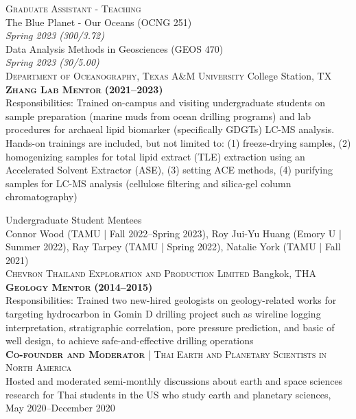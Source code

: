 \documentclass[11pt, letter]{article}
\newcommand{\margintext}[1]{\marginnote{\normalsize\textbf #1 |}}
\begin{document}
\bigskip
\textsc{Graduate Assistant - Teaching} \\
The Blue Planet - Our Oceans (OCNG 251) \\
\textit{Spring 2023 (300/3.72)} \\
Data Analysis Methods in Geosciences (GEOS 470) \\
\textit{Spring 2023 (30/5.00)} \\

\margintext{Mentoring}
\textsc{Department of Oceanography, Texas A\&M University} \hfill College Station, TX \\
\textsc{\textbf{Zhang Lab Mentor}} \textbf{(2021–2023)}\\
\footnotesize 
{\color{gray} Responsibilities: Trained on-campus and visiting undergraduate students on sample preparation (marine muds from ocean drilling programs) and lab procedures for archaeal lipid biomarker (specifically GDGTs) LC-MS analysis. Hands-on trainings are included, but not limited to: (1) freeze-drying samples, (2) homogenizing samples for total lipid extract (TLE) extraction using an Accelerated Solvent Extractor (ASE), (3) setting ACE methods, (4) purifying samples for LC-MS analysis (cellulose filtering and silica-gel column chromatography)}

\normalsize
\bigskip
Undergraduate Student Mentees \\
Connor Wood (TAMU | Fall 2022–Spring 2023), Roy Jui-Yu Huang (Emory U | Summer 2022), Ray Tarpey (TAMU | Spring 2022), Natalie York (TAMU | Fall 2021) \\

\textsc{Chevron Thailand Exploration and Production Limited} \hfill Bangkok, THA \\
\textsc{\textbf{Geology Mentor}} \textbf{(2014–2015)}\\
\footnotesize 
{\color{gray} Responsibilities: Trained two new-hired geologists on geology-related works for targeting hydrocarbon in Gomin D drilling project such as wireline logging interpretation, stratigraphic correlation, pore pressure prediction, and basic of well design, to achieve safe-and-effective drilling operations} \\

\normalsize
\margintext{Leaderships}
\textsc{\textbf{Co-founder and Moderator}} | \textsc{Thai Earth and Planetary Scientists in North America} \\
Hosted and moderated semi-monthly discussions about earth and space sciences research for Thai students in the US who study earth and planetary sciences, May 2020–December 2020
\end{document}
